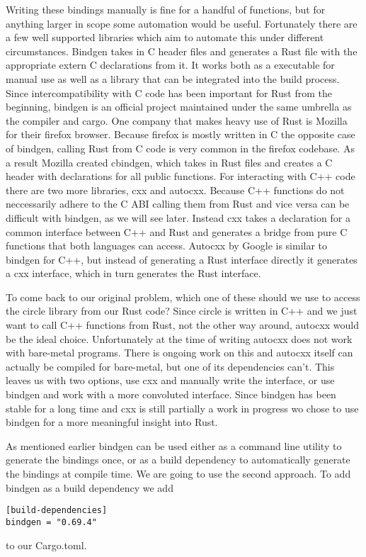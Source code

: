 Writing these bindings manually is fine for a handful of functions, but for anything larger in scope some automation would be useful.
Fortunately there are a few well supported libraries which aim to automate this under different circumstances.
Bindgen takes in C header files and generates a Rust file with the appropriate extern C declarations from it.
It works both as a executable for manual use as well as a library that can be integrated into the build process.
Since intercompatibility with C code has been important for Rust from the beginning,
bindgen is an official project maintained under the same umbrella as the compiler and cargo.
One company that makes heavy use of Rust is Mozilla for their firefox browser.
Because firefox is mostly written in C the opposite case of bindgen, calling Rust from C code is very common in the firefox codebase.
As a result Mozilla created cbindgen, which takes in Rust files and creates a C header with declarations for all public functions.
For interacting with C++ code there are two more libraries, cxx and autocxx.
Because C++ functions do not neccessarily adhere to the C ABI calling them from Rust and vice versa can be difficult with bindgen, as we will see later.
Instead cxx takes a declaration for a common interface between C++ and Rust and generates a bridge from pure C functions that both languages can access.
Autocxx by Google is similar to bindgen for C++, but instead of generating a Rust interface directly it generates a cxx interface, which in turn generates the Rust interface.

To come back to our original problem, which one of these should we use to access the circle library from our Rust code?
Since circle is written in C++ and we just want to call C++ functions from Rust, not the other way around, autocxx would be the ideal choice.
Unfortunately at the time of writing autocxx does not work with bare-metal programs.
There is ongoing work on this and autocxx itself can actually be compiled for bare-metal, but one of its dependencies can't.
This leaves us with two options, use cxx and manually write the interface, or use bindgen and work with a more convoluted interface.
Since bindgen has been stable for a long time and cxx is still partially a work in progress wo chose to use bindgen for a more meaningful insight into Rust.

As mentioned earlier bindgen can be used either as a command line utility to generate the bindings once,
or as a build dependency to automatically generate the bindings at compile time.
We are going to use the second approach.
To add bindgen as a build dependency we add
\begin{verbatim}
[build-dependencies]
bindgen = "0.69.4"
\end{verbatim}
to our Cargo.toml.

